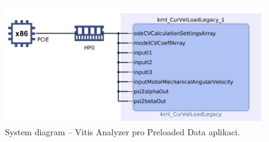 \documentclass[a4paper, twoside, 11pt]{article}
\begin{document}
		\begin{figure}[htbp!]
			\centering
			\includegraphics[width=1\textwidth]{src/png/vitis-analyzer/legacy-rt/1M-data/writing-data-output/legacy-rt-step-0.000001-system-diagram-crop.png}
			\caption{System diagram – Vitis Analyzer pro Preloaded Data aplikaci.}
			\label{fig:legacy-rt-step-0.000001-system-diagram-crop}
		\end{figure}
\end{document}
